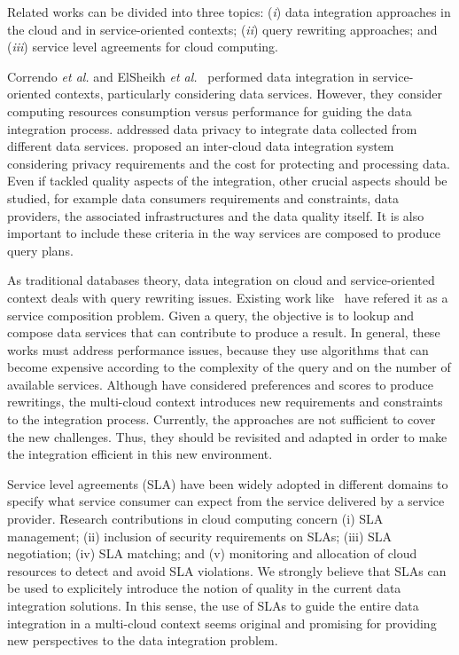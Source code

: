 Related works can be divided into three topics: (\textit{i}) data integration approaches in the cloud and in service-oriented contexts; (\textit{ii}) query rewriting approaches; and (\textit{iii}) service level agreements for cloud computing.

Correndo \textit{et al.} and ElSheikh \textit{et al.}~\cite{Correndo2010,ElSheikh2013} performed data integration in service-oriented contexts, particularly considering data services. However, they  consider computing resources consumption versus performance for guiding the data integration process. \cite{YauY08} addressed data privacy  to integrate data collected from different data services. \cite{Tian2010} proposed an inter-cloud data integration system considering privacy requirements and the cost for protecting and processing data. Even if \cite{Tian2010,YauY08} tackled quality aspects of the integration,  other crucial aspects  should be studied, for example data consumers requirements and constraints, data providers, the associated infrastructures and the data quality itself. It is also important to include these criteria in the way services are composed to produce  query plans.

As traditional databases theory, data integration on cloud and service-oriented context deals with query rewriting issues. Existing work like~\cite{ba2014,Barhamgi2010,Benouaret2011,Umberto} have refered it as a service composition problem. Given a query, the objective is to lookup and compose data services that can contribute to produce a result. In general, these works must address performance issues, because they use algorithms that can become expensive according to the complexity of the query and on the number of available services. Although \cite{ba2014,Benouaret2011} have considered preferences and scores to produce rewritings, the multi-cloud context introduces new requirements and constraints to the integration process. Currently, the approaches are not sufficient to cover the new challenges. Thus, they should be revisited and adapted in order to make the integration efficient in this new environment. 

Service level agreements (SLA) have been widely adopted in different domains to specify what service consumer can expect from the service delivered by a service provider. Research contributions in cloud computing concern (i) SLA management; (ii) inclusion of security requirements on SLAs; (iii) SLA negotiation; (iv) SLA matching; and (v) monitoring and allocation of cloud resources to detect and avoid SLA violations. 
We strongly believe that SLAs can be used  to explicitely introduce the notion of quality in the current data integration solutions. In this sense, the use of SLAs to guide the entire data integration in a multi-cloud context seems original and promising for providing new perspectives to the data integration problem.
